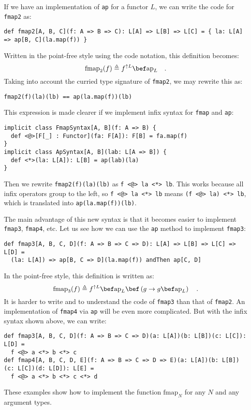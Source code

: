 If we have an implementation of \lstinline!ap! for a functor $L$,
we can write the code for \lstinline!fmap2! as:
\begin{lstlisting}
def fmap2[A, B, C](f: A => B => C): L[A] => L[B] => L[C] = { la: L[A] => ap[B, C](la.map(f)) }
\end{lstlisting}
Written in the point-free style using the code notation, this definition
becomes:
\[
\text{fmap}_{2}(f)\triangleq f^{\uparrow L}\bef\text{ap}_{L}\quad.
\]
Taking into account the curried type signature of \lstinline!fmap2!,
we may rewrite this as:
\begin{lstlisting}
fmap2(f)(la)(lb) == ap(la.map(f))(lb)
\end{lstlisting}
This expression is made clearer if we implement infix syntax for \lstinline!fmap!
and \lstinline!ap!:
\begin{lstlisting}
implicit class FmapSyntax[A, B](f: A => B) {
  def <@>[F[_] : Functor](fa: F[A]): F[B] = fa.map(f)
} 
implicit class ApSyntax[A, B](lab: L[A => B]) {
  def <*>(la: L[A]): L[B] = ap(lab)(la)
}
\end{lstlisting}
Then we rewrite \lstinline!fmap2(f)(la)(lb)! as \lstinline!f <@> la <*> lb!.
This works because all infix operators group to the left, so \lstinline!f <@> la <*> lb!
means \lstinline!(f <@> la) <*> lb!, which is translated into \lstinline!ap(la.map(f))(lb)!.

The main advantage of this new syntax is that it becomes easier to
implement \lstinline!fmap3!, \lstinline!fmap4!, etc. Let us see
how we can use the \lstinline!ap! method to implement \lstinline!fmap3!:
\begin{lstlisting}
def fmap3[A, B, C, D](f: A => B => C => D): L[A] => L[B] => L[C] => L[D] =
  (la: L[A]) => ap[B, C => D](la.map(f)) andThen ap[C, D]
\end{lstlisting}
In the point-free style, this definition is written as:
\[
\text{fmap}_{3}(f)\triangleq f^{\uparrow L}\bef\text{ap}_{L}\bef\left(g\rightarrow g\bef\text{ap}_{L}\right)\quad.
\]
It is harder to write and to understand the code of \lstinline!fmap3!
than that of \lstinline!fmap2!. An implementation of \lstinline!fmap4!
via \lstinline!ap! will be even more complicated. But with the infix
syntax shown above, we can write:
\begin{lstlisting}
def fmap3[A, B, C, D](f: A => B => C => D)(a: L[A])(b: L[B])(c: L[C]): L[D] =
  f <@> a <*> b <*> c
def fmap4[A, B, C, D, E](f: A => B => C => D => E)(a: L[A])(b: L[B])(c: L[C])(d: L[D]): L[E] =
  f <@> a <*> b <*> c <*> d
\end{lstlisting}
These examples show how to implement the function $\text{fmap}_{N}$
for any $N$ and any argument types.


